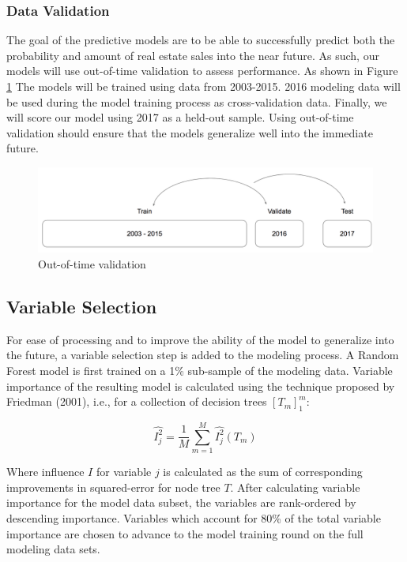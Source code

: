\documentclass[12pt,]{article}
\begin{document}
\hypertarget{data-validation}{%
\subsubsection{Data Validation}\label{data-validation}}

The goal of the predictive models are to be able to successfully predict
both the probability and amount of real estate sales into the near
future. As such, our models will use out-of-time validation to assess
performance. As shown in Figure \ref{fig:Train Test Validate} The models
will be trained using data from 2003-2015. 2016 modeling data will be
used during the model training process as cross-validation data.
Finally, we will score our model using 2017 as a held-out sample. Using
out-of-time validation should ensure that the models generalize well
into the immediate future.

\begin{figure}[h]
\includegraphics[width=1\linewidth]{Sections/tables and figures/Train Validate Test} \caption{Out-of-time validation}\label{fig:Train Test Validate}
\end{figure}

\hypertarget{variable-selection}{%
\subsection{Variable Selection}\label{variable-selection}}

For ease of processing and to improve the ability of the model to
generalize into the future, a variable selection step is added to the
modeling process. A Random Forest model is first trained on a 1\%
sub-sample of the modeling data. Variable importance of the resulting
model is calculated using the technique proposed by Friedman (2001),
i.e., for a collection of decision trees \([T_m]_{1}^{m}\):

\[
  \hat{I_{j}^{2}} = \frac{1}{M} \sum_{m=1}^{M}\hat{I_{j}^{2}}(T_m)
\]

Where influence \(I\) for variable \(j\) is calculated as the sum of
corresponding improvements in squared-error for node tree \(T\). After
calculating variable importance for the model data subset, the variables
are rank-ordered by descending importance. Variables which account for
80\% of the total variable importance are chosen to advance to the model
training round on the full modeling data sets.
\end{document}

